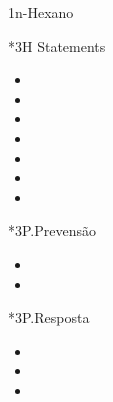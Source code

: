 \begin{sectionBox}1{n-Hexano}


    \begin{multicols}{2}

        \begin{sectionBox}{}
        \end{sectionBox}

        \begin{sectionBox}*3{H Statements}
            \begin{itemize}
                \item {}
                \item {}
                \item {}
                \item {}
                \item {}
                \item {}
                \item {}
            \end{itemize}
        \end{sectionBox}

        \begin{sectionBox}*3{P.Prevensão}
            \begin{itemize}
                \item {}
                \item {}
            \end{itemize}
        \end{sectionBox}

        \begin{sectionBox}*3{P.Resposta}
            \begin{itemize}
                \item {}
                \item {}
                \item {}
            \end{itemize}
        \end{sectionBox}


\end{multicols}
\end{sectionBox}
